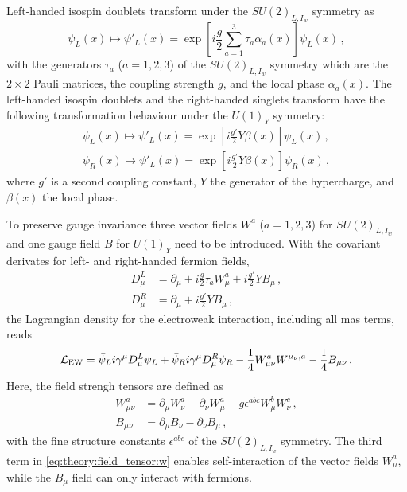 Left-handed isospin doublets transform under the $SU{(2)}_{L,I_w}$ symmetry as
\begin{equation}
    \psi_L(x) \mapsto \psi'_L(x) = \exp \left[ i \frac{g}{2} \sum_{a=1}^{3} \tau_a \alpha_a(x) \right] \psi_L(x) \,,
\end{equation}
with the generators $\tau_a$ ($a = 1, 2, 3$) of the $SU{(2)}_{L,I_w}$ symmetry which are the $2\times 2$ Pauli matrices,
the coupling strength $g$, and the local phase $\alpha_a(x)$.
The left-handed isospin doublets and the right-handed singlets transform have the following transformation behaviour under the $U{(1)}_Y$ symmetry:
\begin{gather}
    \psi_L(x) \mapsto \psi'_L(x) = \exp \left[ i \frac{g'}{2} Y \beta(x) \right] \psi_L(x) \,, \\
    \psi_R(x) \mapsto \psi'_L(x) = \exp \left[ i \frac{g'}{2} Y \beta(x) \right] \psi_R(x) \,,
\end{gather}
where $g'$ is a second coupling constant, $Y$ the generator of the hypercharge, and $\beta(x)$ the local phase.

To preserve gauge invariance three vector fields $W^a$ ($a = 1,2,3$) for $SU{(2)}_{L,I_w}$ and one gauge field $B$
for $U{(1)}_Y$ need to be introduced.
With the covariant derivates for left- and right-handed fermion fields,
\begin{align}
    \label{eq:theory:ew:D}
    D_\mu^L &= \partial_\mu + i \frac{g}{2} \tau_a W_\mu^a + i \frac{g'}{2} Y B_\mu \,, \\
    D_\mu^R &= \partial_\mu + i \frac{g'}{2} Y B_\mu \,,
\end{align}
the Lagrangian density for the electroweak interaction, including all mas terms, reads
\begin{equation}
    \label{eq:theory:ew:l}
    \mathcal{L}_\text{EW} = \bar{\psi}_L i \gamma^\mu D_\mu^L \psi_L + \bar{\psi}_R i \gamma^\mu D_\mu^R \psi_R - \frac{1}{4} W_{\mu\nu}^a W^{\mu_\nu,a} - \frac{1}{4} B_{\mu\nu} \,.
\end{equation}
Here, the field strengh tensors are defined as
\begin{align}
    \label{eq:theory:field_tensor:w}
    W_{\mu\nu}^a &= \partial_\mu W_\nu^a - \partial_\nu W_\mu^a - g \epsilon^{abc} W_\mu^b W_\nu^c \,, \\
    B_{\mu\nu}   &= \partial_\mu B_\nu - \partial_\nu B_\mu \,,
\end{align}
with the fine structure constants $\epsilon^{abc}$ of the $SU{(2)}_{L,I_w}$ symmetry.
The third term in \cref{eq:theory:field_tensor:w} enables self-interaction of the vector fields $W^a_\mu$, while the $B_\mu$ field
can only interact with fermions.

